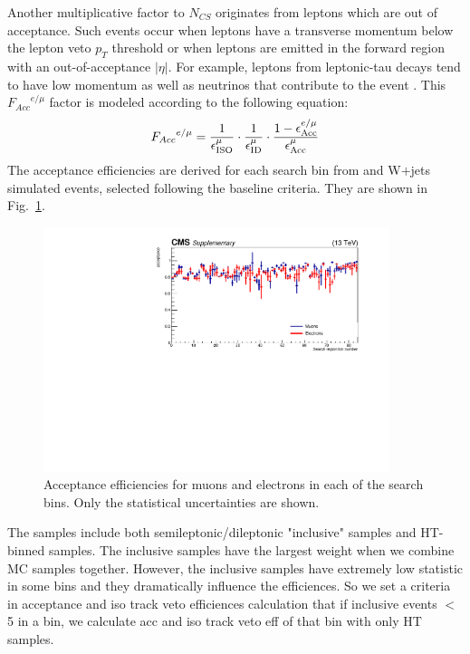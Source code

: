 Another multiplicative factor to $N_{CS}$ originates from leptons which 
are out of acceptance. Such events occur when leptons have a transverse 
momentum below the lepton veto $p_{T}$ threshold or when leptons are emitted in 
the forward region with an out-of-acceptance $|\eta|$. %
For example, leptons from leptonic-tau decays tend to have low 
momentum as well as neutrinos that contribute to the event \MET. 
This ${F_{Acc}}^{e/\mu}$ factor is modeled according to the following equation:
\begin{equation}
{F_{Acc}}^{e/\mu} = \frac{1}{\epsilon_{\rm ISO}^{\mu}}\cdot \frac{1}{\epsilon_{\rm ID}^{\mu}}  \cdot \frac{1 - \epsilon^{e/\mu}_{\rm Acc}}{\epsilon^{\mu}_{\rm Acc}}
\label{eq:accept}
\end{equation}
The acceptance efficiencies are derived for each search bin 
from \ttbar and W$+$jets simulated events,
selected following the baseline criteria. 
They are shown in Fig.~\ref{fig:acceptance}.

\begin{figure}[hptb]
\begin{center}
\includegraphics[width=0.9\textwidth]{sections/mc4/Backgrounds/LostLepton/figures/v2_acc_eff_84bins.pdf}%
\end{center}
\caption{Acceptance efficiencies for muons and electrons in each of the
search bins. Only the statistical uncertainties are shown.}
\label{fig:acceptance}
\end{figure}

The \ttbar samples include both semileptonic/dileptonic "inclusive" samples and HT-binned samples.
The \ttbar inclusive samples have the largest weight when we combine MC samples together.
However, the \ttbar inclusive samples have extremely low statistic in some bins and they dramatically influence the efficiences.
So we set a criteria in acceptance and iso track veto efficiences calculation that if \ttbar inclusive events $<$ 5 in a bin,
we calculate acc and iso track veto eff of that bin with only HT samples.

